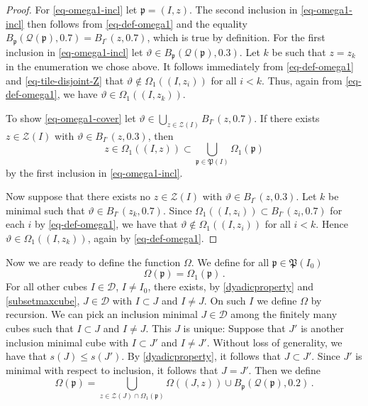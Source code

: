 \documentclass[10pt,a4paper]{article}
\theoremstyle{plain}
\theoremstyle{definition}
\numberwithin{equation}{subsection}
\newcommand{\fp}{{\mathfrak p}}
\newcommand{\fP}{{\mathfrak P}}
\newcommand{\fc}{{\Omega}}
\newcommand{\mfa}{{\vartheta}}
\newcommand{\fcc}{{\mathcal{Q}}}
\newcommand{\leanok}{}
\begin{document}
\begin{proof}
    \leanok
    For \eqref{eq-omega1-incl} let $\fp = (I, z)$.
    The second inclusion in \eqref{eq-omega1-incl} then follows from \eqref{eq-def-omega1} and the equality $B_{\fp}(\fcc(\fp), 0.7) = B_{I^\circ}(z, 0.7)$, which is true by definition.
    For the first inclusion in \eqref{eq-omega1-incl} let $\mfa \in B_{\fp}(\fcc(\fp),0.3)$. Let $k$ be such that $z = z_k$ in the enumeration we chose above. It follows immediately from \eqref{eq-def-omega1} and \eqref{eq-tile-disjoint-Z} that
    $\mfa \notin \Omega_1((I, z_i))$ for all $i < k$. Thus, again from \eqref{eq-def-omega1}, we have
    $\mfa \in \Omega_1((I,z_k))$.

    To show \eqref{eq-omega1-cover} let $\mfa \in \bigcup_{z \in \mathcal{Z}(I)} B_{I^\circ}(z,0.7)$.
    If there exists $z \in \mathcal{Z}(I)$ with $\mfa \in B_{I^\circ}(z,0.3)$, then
    $$
        z \in \Omega_1((I, z)) \subset \bigcup_{\fp \in \fP(I)} \Omega_1(\fp)
    $$
    by the first inclusion in \eqref{eq-omega1-incl}.

    Now suppose that there exists no $z \in \mathcal{Z}(I)$ with $\mfa \in B_{I^\circ}(z, 0.3)$. Let $k$ be minimal such that $\mfa \in B_{I^\circ}(z_k, 0.7)$. Since $\Omega_1((I, z_i)) \subset B_{I^\circ}(z_i, 0.7)$ for each $i$ by \eqref{eq-def-omega1}, we have that $\mfa \notin \Omega_1((I, z_i))$ for all $i < k$. Hence $\mfa \in \Omega_1((I, z_k))$, again by \eqref{eq-def-omega1}.
\end{proof}

Now we are ready to define the function $\Omega$. We define for all $\fp \in \fP(I_0)$
\begin{equation}
    \label{eq-max-omega}
    \fc(\fp) = \Omega_1(\fp)\,.
\end{equation}
For all other cubes $I \in \mathcal{D}$, $I \ne I_0$, there exists, by \eqref{dyadicproperty} and \eqref{subsetmaxcube}, $J \in \mathcal{D}$ with $I \subset J$ and $I \ne J$. On such $I$ we define $\Omega$ by recursion. We can pick an inclusion minimal $J \in \mathcal{D}$ among the finitely many cubes such that $I \subset J$ and $I \ne J$. This $J$ is unique: Suppose that $J'$ is another inclusion minimal cube with $I \subset J'$ and $I \ne J'$. Without loss of generality, we have that $s(J) \le s(J')$. By \eqref{dyadicproperty}, it follows that $J \subset J'$. Since $J'$ is minimal with respect to inclusion, it follows that $J = J'$. Then we define
\begin{equation}
    \label{eq-it-omega}
    \fc(\fp) = \bigcup_{z \in \mathcal{Z}(J) \cap \Omega_1(\fp)} \Omega((J, z)) \cup B_{\fp}(\fcc(\fp),0.2)\,.
\end{equation}
\end{document}
